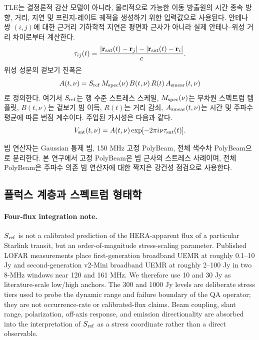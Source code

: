 \documentclass[final,5p,times]{elsarticle}
\begin{document}
TLE는 결정론적 감산 모델이 아니라, 물리적으로 가능한 이동 방출원의 시간 종속 방향, 거리, 지연 및
프린지-레이트 궤적을 생성하기 위한 입력값으로 사용된다. 안테나 쌍 $(i,j)$에 대한 근거리 기하학적
지연은 평면파 근사가 아니라 실제 안테나--위성 거리 차이로부터 계산한다.
\begin{equation}
  \tau_{ij}(t)=\frac{|\mathbf{r}_{\rm sat}(t)-\mathbf{r}_{j}|-|\mathbf{r}_{\rm sat}(t)-\mathbf{r}_{i}|}{c}.
\end{equation}
위성 성분의 겉보기 진폭은
\begin{equation}
  A(t,\nu)=S_{\rm ref}\,M_{\rm spec}(\nu)\,B(t,\nu)\,R(t)\,A_{\rm smear}(t,\nu)
\end{equation}
로 정의한다. 여기서 $S_{\rm ref}$는 행 수준 스트레스 스케일, $M_{\rm spec}(\nu)$는 무차원 스펙트럼
템플릿, $B(t,\nu)$는 겉보기 빔 이득, $R(t)$는 거리 감쇠, $A_{\rm smear}(t,\nu)$는 시간 및 주파수 평균에
따른 번짐 계수이다. 주입된 가시성은 다음과 같다.
\begin{equation}
  V_{\rm sat}(t,\nu)=A(t,\nu)\exp[-2\pi i\nu\tau_{\rm sat}(t)].
\end{equation}

빔 연산자는 Gaussian 통제 빔, 150 MHz 고정 PolyBeam, 전체 색수차 PolyBeam으로
분리한다. 본 연구에서 고정 PolyBeam은 빔 근사의 스트레스 사례이며, 전체 PolyBeam은
주파수 의존 빔 연산자에 대한 짝지은 강건성 점검으로 사용한다.

\subsection{플럭스 계층과 스펙트럼 형태학}
\label{sec:data:flux_morphology}

\paragraph{Four-flux integration note.}
$S_{\rm ref}$ is not a calibrated prediction of the HERA-apparent flux of a
particular Starlink transit, but an order-of-magnitude stress-scaling
parameter. Published LOFAR measurements place first-generation broadband UEMR
at roughly 0.1--10 Jy and second-generation v2-Mini broadband UEMR at roughly
2--100 Jy in two 8-MHz windows near 120 and 161 MHz. We therefore use 10 and
30 Jy as literature-scale low/high anchors. The 300 and 1000 Jy levels are
deliberate stress tiers used to probe the dynamic range and failure boundary
of the QA operator; they are not occurrence-rate or calibrated-flux claims.
Beam coupling, slant range, polarization, off-axis response, and emission
directionality are absorbed into the interpretation of $S_{\rm ref}$ as a
stress coordinate rather than a direct observable.
\end{document}

